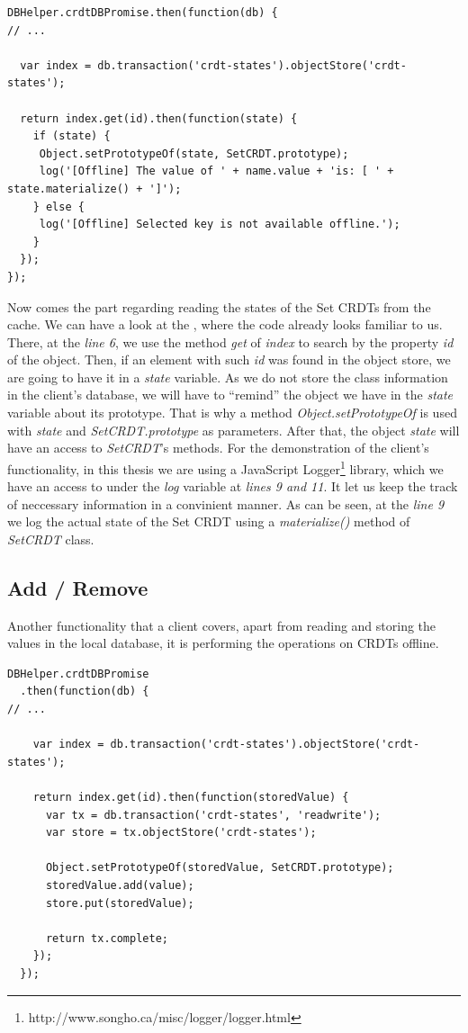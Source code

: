 \begin{lstlisting}[caption={Reading CRDT states from client's cache.}, label={lst:dev10}]
DBHelper.crdtDBPromise.then(function(db) {
// ...

  var index = db.transaction('crdt-states').objectStore('crdt-states');

  return index.get(id).then(function(state) {
    if (state) {
     Object.setPrototypeOf(state, SetCRDT.prototype);
     log('[Offline] The value of ' + name.value + 'is: [ ' + state.materialize() + ']');
    } else {
     log('[Offline] Selected key is not available offline.');
    }
  });
});
\end{lstlisting}

Now comes the part regarding reading the states of the Set CRDTs from the cache. We can have a look at the , where the code already looks familiar to us. There, at the \textit{line 6}, we use the method \textit{get} of \textit{index} to search by the property \textit{id} of the object. Then, if an element with such \textit{id} was found in the object store, we are going to have it in a \textit{state} variable. As we do not store the class information in the client's database, we will have to ``remind'' the object we have in the \textit{state} variable about its prototype. That is why a method \textit{Object.setPrototypeOf} is used with \textit{state} and \textit{SetCRDT.prototype} as parameters. After that, the object \textit{state} will have an access to \textit{SetCRDT}'s methods. For the demonstration of the client's functionality, in this thesis we are using a JavaScript Logger\footnote{http://www.songho.ca/misc/logger/logger.html} library, which we have an access to under the \textit{log} variable at \textit{lines 9 and 11}. It let us keep the track of neccessary information in a convinient manner. As can be seen, at the \textit{line 9} we log the actual state of the Set CRDT using a \textit{materialize()} method of \textit{SetCRDT} class.

\subsection*{Add / Remove}

Another functionality that a client covers, apart from reading and storing the values in the local database, it is performing the operations on CRDTs offline.

\begin{lstlisting}[caption={Performing an operation \textit{add} on a Set CRDT while the client is offline.}, label={lst:dev11}]
DBHelper.crdtDBPromise
  .then(function(db) {
// ...

    var index = db.transaction('crdt-states').objectStore('crdt-states');

    return index.get(id).then(function(storedValue) {
      var tx = db.transaction('crdt-states', 'readwrite');
      var store = tx.objectStore('crdt-states');

      Object.setPrototypeOf(storedValue, SetCRDT.prototype);
      storedValue.add(value);
      store.put(storedValue);

      return tx.complete;
    });
  });
\end{lstlisting}

